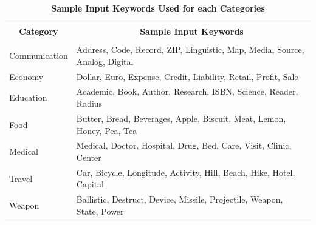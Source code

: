 \documentclass[12pt, oneside]{book}
\begin{document}
\begin{table}[h]
	\begin{center}
		\caption{\textbf{Sample Input Keywords Used for each Categories}}
		\label{tab: sample_keyword_input}
		\begin{tabular}{| p{} | p{} |}
			\hline
			\multicolumn{1}{|c|}{} & \multicolumn{1}{c|}{} \\
			\multicolumn{1}{|c|}{\textbf{Category}} & \multicolumn{1}{c|}{\textbf{Sample Input Keywords}} \\
			\multicolumn{1}{|c|}{} & \multicolumn{1}{c|}{} \\
			\hline
			Communication & Address, Code, Record, ZIP, Linguistic, Map, Media, Source, Analog, Digital \\ \hline
			Economy &  Dollar, Euro, Expense, Credit, Liability, Retail, Profit, Sale\\ \hline
			Education & Academic, Book, Author, Research, ISBN, Science, Reader, Radius\\ \hline
			Food & Butter, Bread, Beverages, Apple, Biscuit, Meat, Lemon, Honey, Pea, Tea\\ \hline
			Medical & Medical, Doctor, Hospital, Drug, Bed, Care, Visit, Clinic, Center\\ \hline
			Travel & Car, Bicycle, Longitude, Activity, Hill, Beach, Hike, Hotel, Capital\\ \hline
			Weapon & Ballistic, Destruct, Device, Missile, Projectile, Weapon, State, Power\\ \hline
		\end{tabular}
	\end{center}
\end{table}
\end{document}
